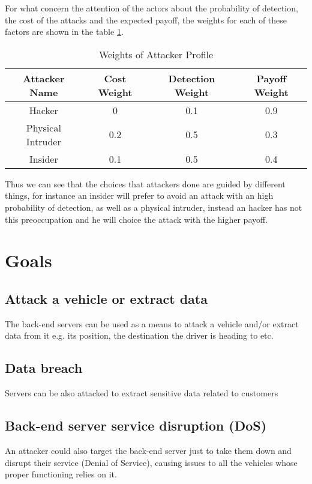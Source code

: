\noindent For what concern the attention of the actors about the probability of detection, the cost of the attacks and the expected payoff, the weights for each of these factors are shown in the table \ref{tab: weights}.

\begin{table}[htpb]
	\centering
	\begin{tabular}{|c|c|c|c|}
		\hline
		\textbf{Attacker Name} & \textbf{Cost Weight} & \textbf{Detection Weight} & \textbf{Payoff Weight} \\ \hline
		Hacker                 & 0                    & 0.1                       & 0.9                    \\ \hline
		Physical Intruder      & 0.2                  & 0.5                       & 0.3                    \\ \hline
		Insider                & 0.1                  & 0.5                       & 0.4                    \\ \hline
	\end{tabular}
	\caption{Weights of Attacker Profile}
	\label{tab: weights}
\end{table}

\noindent  Thus we can see that the choices that attackers done are guided by different things, for instance an insider will prefer to avoid an attack with an high probability of detection, as well as a physical intruder, instead an hacker has not this preoccupation and he will choice the attack with the higher payoff.

\section{Goals}

\subsection*{Attack a vehicle or extract data}
The back-end servers can be used as a means to attack a vehicle and/or extract data from it e.g. its position, the destination the driver is heading to etc.

\subsection*{Data breach}
Servers can be also attacked to extract sensitive data related to customers

\subsection*{Back-end server service disruption (DoS)}
An attacker could also target the back-end server just to take them down and disrupt their service (Denial of Service), causing issues to all the vehicles whose proper functioning relies on it.